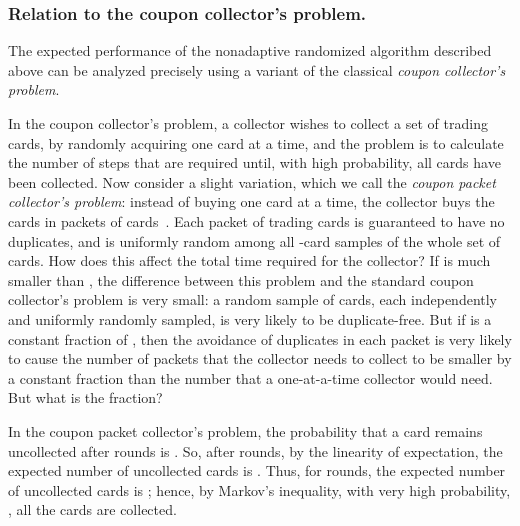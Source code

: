 \documentclass[11pt]{llncs}
\begin{document}
\subsubsection{Relation to the coupon collector's problem.}
The expected performance 
of the nonadaptive randomized algorithm described above can be analyzed 
precisely using a variant of the classical \emph{coupon collector's problem}.

In the coupon collector's problem, a collector wishes to collect a set of  trading cards, by randomly acquiring one card at a time,
and the problem is to calculate the number of steps that are required until, with high probability, all cards have been collected. 
Now consider a slight variation, 
which we call the \emph{coupon packet collector's problem}:
instead of buying one card at a time, the collector buys the cards in
packets of  cards~\cite{Stadje1990}.
Each packet of trading cards is guaranteed to have no
duplicates, and is uniformly random among all -card samples of the whole
set of cards. How does this affect the total time required for the
collector? If  is much smaller than , the difference between this problem and the standard coupon collector's problem is very small: a random sample of  cards,
each independently and uniformly randomly sampled, is very likely to be
duplicate-free. But if  is a constant fraction of ,  then the avoidance of
duplicates in each packet is very likely to cause the number of packets that
the collector needs to collect to be smaller by a constant fraction than the
number that a one-at-a-time collector would need. But what is the fraction?

In the coupon packet collector's problem, the probability that a card
remains uncollected after  rounds is . So, after
 rounds, by the linearity of expectation, the expected number
of uncollected cards is .
Thus, for  rounds, 
the expected number of uncollected cards is ;
hence, 
by Markov's inequality, 
with very high probability,
, 
all the cards are collected.
\end{document}
